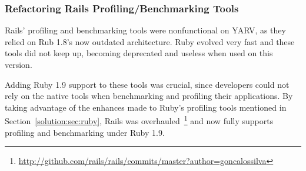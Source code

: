 \subsubsection{Refactoring Rails Profiling/Benchmarking Tools}
Rails' profiling and benchmarking tools were nonfunctional on YARV, as they relied on Rub 1.8's now outdated architecture. Ruby evolved very fast and these tools did not keep up, becoming deprecated and useless when used on this version.

Adding Ruby 1.9  support to these tools was crucial, since developers could not rely on the native tools when benchmarking and profiling their applications. By taking advantage of the enhances made to Ruby's profiling tools mentioned in Section~\ref{solution:sec:ruby}, Rails was overhauled~\footnote{\url{http://github.com/rails/rails/commits/master?author=goncalossilva}} and now fully supports profiling and benchmarking under Ruby 1.9.


